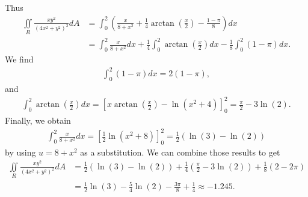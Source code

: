\documentclass{article}
\newcommand{\di}{\iint\limits}
\begin{document}
Thus
\begin{align*}
  \di_R\frac{xy^2}{(4x^2+y^2)^2}dA&=\int_0^2\left(\frac{x}{8+x^2}+\frac{1}{4}\arctan\left(\frac{x}{2}\right)
  -\frac{1-\pi}{8}\right)dx\\
  &=\int_0^2 \frac{x}{8+x^2}dx + \frac{1}{4}\int_0^2\arctan\left(\frac{x}{2}\right)dx-\frac{1}{8}\int_0^2 (1-\pi)dx.
\end{align*}
We find 
\begin{align*}
  \int_0^2 (1-\pi)dx = 2(1-\pi),
\end{align*}
and
\begin{align*}
  \int_0^2 \arctan\left(\frac{x}{2}\right)dx
  =\left[x\arctan\left(\frac{x}{2}\right)
  -\ln (x^2+4)\right]^2_0=
  \frac{\pi}{2}-3\ln(2).
\end{align*}
Finally, we obtain
\begin{align*}
  \int_0^2\frac{x}{8+x^2}dx=\left[\frac{1}{2}\ln(x^2+8)\right]_0^2=\frac{1}{2}\left(\ln(3)-\ln(2)\right)
\end{align*}
by using $u=8+x^2$ as a substitution. We can combine those results
to get
\begin{align*}
  \di_R\frac{xy^2}{(4x^2+y^2)^2}dA
  &=\frac{1}{2}\left(\ln(3)-\ln(2)\right)
  +\frac{1}{4}\left(\frac{\pi}{2}-3\ln(2)\right)
  +\frac{1}{8}(2 - 2\pi)\\
  &=\frac{1}{2}\ln(3)-\frac{5}{4}\ln(2)-\frac{3\pi}{8}+\frac{1}{4}
  \approx -1.245.
\end{align*}
\end{document}
